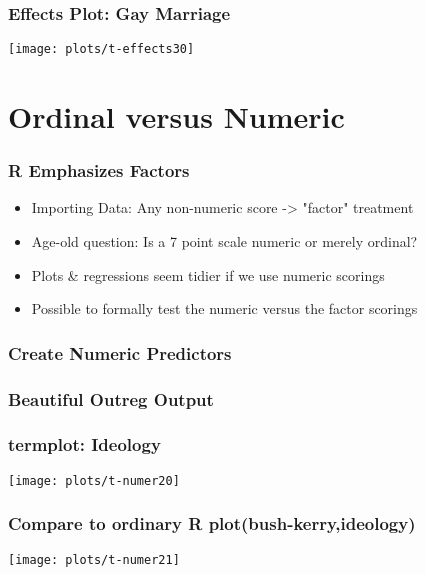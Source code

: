 \documentclass[10pt,english]{beamer}
\def\lyxframeend{} %
\begin{document}
\begin{frame}[containsverbatim]
\frametitle{Effects Plot: Gay Marriage}



\texttt{[image: plots/t-effects30]}

\end{frame}


\lyxframeend{}\section{Ordinal versus Numeric}

\begin{frame}[containsverbatim]
\frametitle{R Emphasizes Factors}
  \begin{itemize}
    \item Importing Data: Any non-numeric score -> "factor" treatment
    \item Age-old question: Is a 7 point scale numeric or merely ordinal?
    \item Plots \& regressions seem tidier if we use numeric scorings
    \item Possible to formally test the numeric versus the factor scorings
  \end{itemize}
\end{frame}

\begin{frame}[containsverbatim]
\frametitle{Create Numeric Predictors}







\end{frame}

\begin{frame}[containsverbatim]
\frametitle{Beautiful Outreg Output}

\scriptsize{

}

\end{frame}

\begin{frame}[containsverbatim]
\frametitle{termplot: Ideology}


\texttt{[image: plots/t-numer20]}

\end{frame}

\begin{frame}[containsverbatim]
\frametitle{Compare to ordinary R plot(bush-kerry,ideology)}


\texttt{[image: plots/t-numer21]}

\end{frame}
\end{document}
